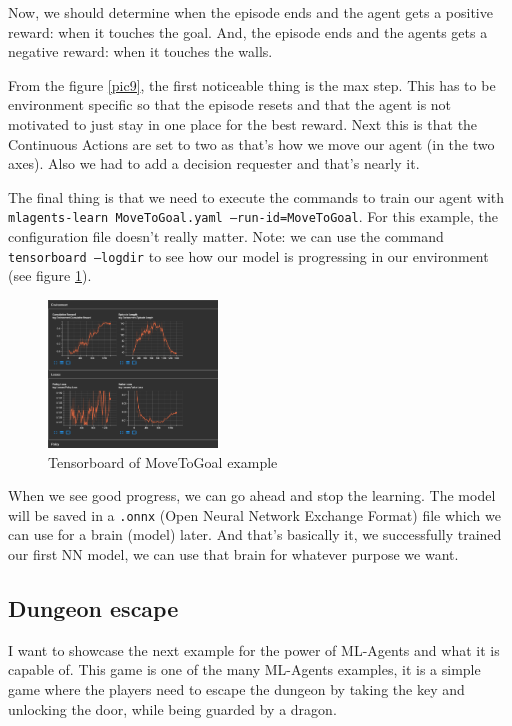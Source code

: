 \documentclass[a4paper, 12pt]{book}
\begin{document}
Now, we should determine when the episode ends and the agent gets a positive reward: when it touches the goal. 
And, the episode ends and the agents gets a negative reward: when it touches the walls.

From the figure \ref{pic9}, the first noticeable thing is the max step. This has to be environment specific so that the episode resets and that the agent is not motivated to just stay in one place for the best reward. Next this is that the Continuous Actions are set to two as that's how we move our agent (in the two axes). Also we had to add a decision requester and that's nearly it.

The final thing is that we need to execute the commands to train our agent with \texttt{mlagents-learn MoveToGoal.yaml --run-id=MoveToGoal}. For this example, the configuration file doesn't really matter. Note: we can use the command \texttt{tensorboard --logdir} to see how our model is progressing in our environment (see figure \ref{pic10}).

\begin{figure}[ht]
\begin{center}
\includegraphics[width=0.4\textwidth]{Images/tensorboard.png}
\end{center}
\caption{Tensorboard of MoveToGoal example}
\label{pic10}
\end{figure}

When we see good progress, we can go ahead and stop the learning. The model will be saved in a \texttt{.onnx} (Open Neural Network Exchange Format) file which we can use for a brain (model) later. And that's basically it, we successfully trained our first NN model, we can use that brain for whatever purpose we want.

\subsection{Dungeon escape}

I want to showcase the next example for the power of ML-Agents and what it is capable of. This game is one of the many ML-Agents \cite{MLAgents} examples, it is a simple game where the players need to escape the dungeon by taking the key and unlocking the door, while being guarded by a dragon.
\end{document}
